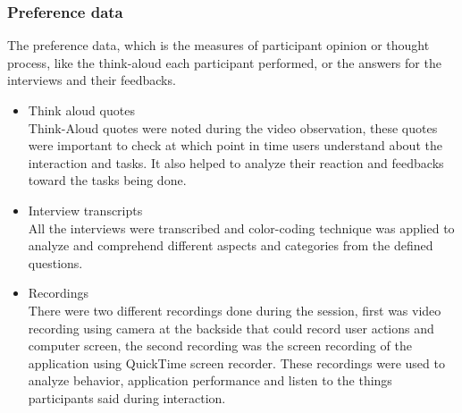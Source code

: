 \subsubsection{Preference data}
The preference data, which is the measures of participant opinion or thought process, like the think-aloud each participant performed, or the answers for the interviews and their feedbacks.
\begin{itemize}

\item Think aloud quotes \\
Think-Aloud quotes were noted during the video observation, these quotes were important to check at which point in time users understand about the interaction and tasks. It also helped to analyze their reaction and feedbacks toward the tasks being done.

\item Interview transcripts \\
All the interviews were transcribed and color-coding technique was applied to analyze and comprehend different aspects and categories from the defined questions.


\item Recordings \\
There were two different recordings done during the session, first was video recording using camera at the backside that could record user actions and computer screen, the second recording was the screen recording of the application using QuickTime screen recorder. These recordings were used to analyze behavior, application performance and listen to the things participants said during interaction.



\end{itemize}
